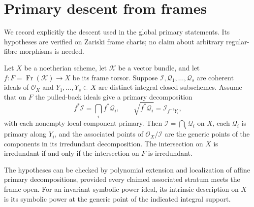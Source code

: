 \section{Primary descent from frames}
\label{sec:frame-primary-descent}
We record explicitly the descent used in the global primary
statements. Its hypotheses are verified on Zariski frame charts;
no claim about arbitrary regular-fibre morphisms is needed.

\begin{lemma}
\label{lem:frame-primary-descent}
Let $X$ be a noetherian scheme, let $\mathcal K$ be a vector bundle,
and let $f:F=\operatorname{Fr}(\mathcal K)\to X$ be its frame
torsor. Suppose $\mathcal I,\mathcal Q_1,\ldots,\mathcal Q_s$
are coherent ideals of $\mathcal O_X$ and
$Y_1,\ldots,Y_s\subset X$ are distinct integral closed subschemes.
Assume that on $F$ the pulled-back ideals give a primary decomposition
\[
 f^*\mathcal I=\bigcap_i f^*\mathcal Q_i,
 \qquad \sqrt{f^*\mathcal Q_i}=\mathcal I_{f^{-1}Y_i},
\]
with each nonempty local component primary. Then
$\mathcal I=\bigcap_i\mathcal Q_i$ on $X$, each $\mathcal Q_i$
is primary along $Y_i$, and the associated points of
$\mathcal O_X/\mathcal I$ are the generic points of the components
in its irredundant decomposition. The intersection on $X$ is
irredundant if and only if the intersection on $F$ is irredundant.

The hypotheses can be checked by polynomial extension and localization
of affine primary decompositions, provided every claimed associated
stratum meets the frame open. For an invariant symbolic-power ideal,
its intrinsic description on $X$ is its symbolic power at the generic
point of the indicated integral support.
\end{lemma}
